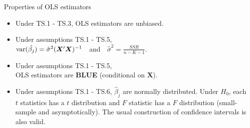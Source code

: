 \documentclass{beamer}
\begin{document}
\begin{frame}{Properties of OLS estimators}
\begin{itemize}
\item Under TS.1 - TS.3, OLS estimators are unbiased.
\medskip
\item Under assumptions TS.1 - TS.5, \\ \medskip
$\textnormal{var}(\hat{\beta_j})=\hat{\sigma}^2(\bm{X}^{\prime}\bm{X})^{-1}$~~and~~$\hat{\sigma}^2=\frac{SSR}{n-K-1}$.
\medskip
\item Under assumptions TS.1 - TS.5, \\ \medskip OLS estimators are \textbf{BLUE} (conditional on $\boldsymbol{X}$).
\medskip
\item Under assumptions TS.1 - TS.6, $\hat{\beta}_j$ are normally distributed. Under $H_0$, each $t$ statistics has a $t$ distribution and $F$ statistic has a $F$ distribution (small-sample and asymptotically). The usual construction of confidence intervals is also valid. 
\end{itemize}
\end{frame}
\end{document}
